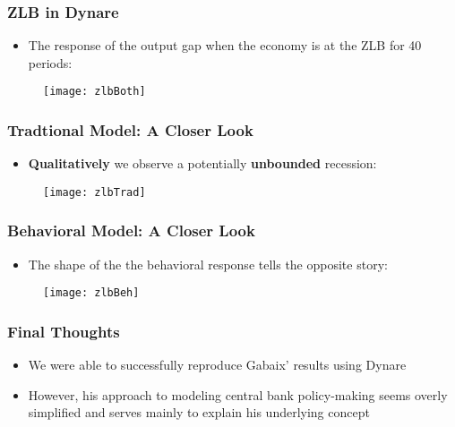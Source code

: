 \documentclass{beamer}
\begin{document}

\begin{frame}
	\frametitle{ZLB in Dynare}
	\begin{itemize}
		\item The response of the output gap when the economy is at the ZLB for 40 periods:
	\end{itemize}
	\begin{figure}[h]
		\texttt{[image: zlbBoth]}
	\end{figure}	
\end{frame}


\begin{frame}
	\frametitle{Tradtional Model: A Closer Look}
	\begin{itemize}
		\item \textbf{Qualitatively} we observe a potentially \textbf{unbounded} recession: 
	\end{itemize}
	\begin{figure}[h]
		\texttt{[image: zlbTrad]}
	\end{figure}	
\end{frame}


\begin{frame}
	\frametitle{Behavioral Model: A Closer Look}
	\begin{itemize}
		\item The shape of the the behavioral response tells the opposite story:
	\end{itemize}
	\begin{figure}[h]
		\texttt{[image: zlbBeh]}
	\end{figure}	
\end{frame}


\begin{frame}
	\frametitle{Final Thoughts}
	\begin{itemize}
		\item We were able to successfully reproduce Gabaix' results using Dynare
		\vspace{8pt}
		\item However, his approach to modeling central bank policy-making seems overly simplified and serves mainly to explain his underlying concept 
	\end{itemize}
\end{frame}
\end{document}
